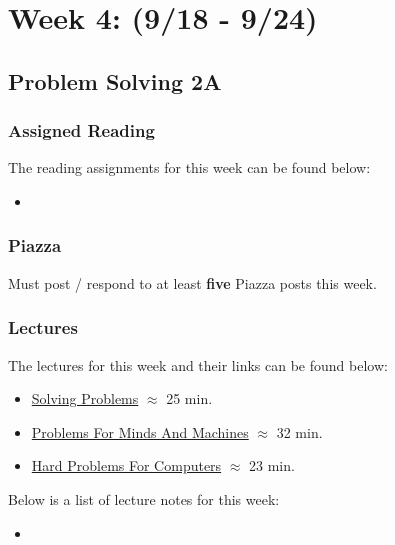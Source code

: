\clearpage
\chapter{Week 4: (9/18 - 9/24)}

\section{Problem Solving 2A}

\subsection{Assigned Reading}

The reading assignments for this week can be found below:

\begin{itemize}
    \item {}
\end{itemize}

\subsection{Piazza}

Must post / respond to at least \textbf{five} Piazza posts this week.  

\subsection{Lectures}

The lectures for this week and their links can be found below:

\begin{itemize}
    \item \href{https://applied.cs.colorado.edu/mod/hvp/view.php?id=49348}{Solving Problems} $\approx$ 25 min.
    \item \href{https://applied.cs.colorado.edu/mod/hvp/view.php?id=49349}{Problems For Minds And Machines} $\approx$ 32 min.
    \item \href{https://applied.cs.colorado.edu/mod/hvp/view.php?id=49350}{Hard Problems For Computers} $\approx$ 23 min.
\end{itemize}

\noindent Below is a list of lecture notes for this week:

\begin{itemize}
    \item {}
\end{itemize}

